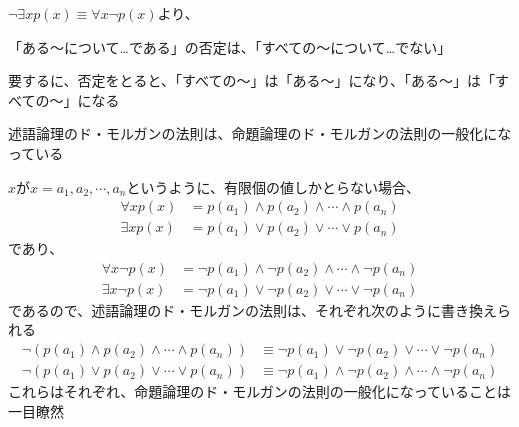 \documentclass[b5paper,12pt]{jsarticle}
\begin{document}
$\neg \exists x p(x) \equiv \forall x \neg p(x)$より、
\begin{shaded}
  「ある〜について…である」の否定は、「すべての〜について…でない」
\end{shaded}

要するに、否定をとると、「すべての〜」は「ある〜」になり、「ある〜」は「すべての〜」になる

\sectionline

述語論理のド・モルガンの法則は、命題論理のド・モルガンの法則の一般化になっている

\br

$x$が$x = a_1, a_2, \cdots , a_n$というように、有限個の値しかとらない場合、
\begin{align*}
  \forall x p(x) & = p(a_1) \land p(a_2) \land \cdots \land p(a_n) \\
  \exists x p(x) & = p(a_1) \lor p(a_2) \lor \cdots \lor p(a_n)
\end{align*}
であり、
\begin{align*}
  \forall x \neg p(x) & = \neg p(a_1) \land \neg p(a_2) \land \cdots \land \neg p(a_n) \\
  \exists x \neg p(x) & = \neg p(a_1) \lor \neg p(a_2) \lor \cdots \lor \neg p(a_n)
\end{align*}
であるので、述語論理のド・モルガンの法則は、それぞれ次のように書き換えられる
\begin{align*}
  \neg (p(a_1) \land p(a_2) \land \cdots \land p(a_n)) & \equiv \neg p(a_1) \lor \neg p(a_2) \lor \cdots \lor \neg p(a_n)    \\
  \neg (p(a_1) \lor p(a_2) \lor \cdots \lor p(a_n))    & \equiv \neg p(a_1) \land \neg p(a_2) \land \cdots \land \neg p(a_n)
\end{align*}
これらはそれぞれ、命題論理のド・モルガンの法則の一般化になっていることは一目瞭然
\end{document}
